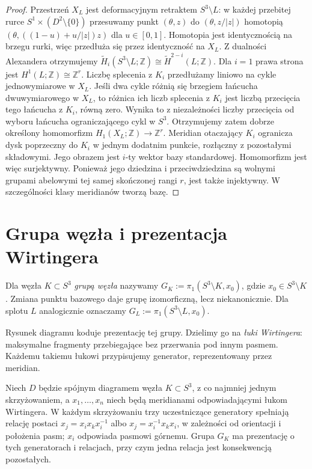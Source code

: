 \begin{proof}
Przestrzeń $X_L$ jest deformacyjnym retraktem
$S^3\setminus L$: w każdej przebitej rurce
$S^1\times(D^2\setminus\{0\})$ przesuwamy punkt
$(\theta,z)$ do $(\theta,z/|z|)$ homotopią
$(\theta,((1-u)+u/|z|)z)$ dla $u\in[0,1]$.
Homotopia jest identycznością na brzegu rurki,
więc przedłuża się przez identyczność na $X_L$.
Z dualności Alexandera otrzymujemy
$\widetilde H_i(S^3\setminus L;\mathbb Z)
\cong\widetilde H^{2-i}(L;\mathbb Z)$.
Dla $i=1$ prawa strona jest $H^1(L;\mathbb Z)\cong\mathbb Z^r$.
Liczbę splecenia z $K_i$ przedłużamy liniowo
na cykle jednowymiarowe w $X_L$. Jeśli dwa cykle
różnią się brzegiem łańcucha dwuwymiarowego w $X_L$,
to różnica ich liczb splecenia z $K_i$ jest liczbą
przecięcia tego łańcucha z $K_i$, równą zero.
Wynika to z niezależności liczby przecięcia od wyboru
łańcucha ograniczającego cykl w $S^3$.
Otrzymujemy zatem dobrze określony homomorfizm
$H_1(X_L;\mathbb Z)\to\mathbb Z^r$.
Meridian otaczający $K_i$ ogranicza dysk poprzeczny
do $K_i$ w jednym dodatnim punkcie, rozłączny
z pozostałymi składowymi. Jego obrazem jest $i$-ty
wektor bazy standardowej. Homomorfizm jest więc
surjektywny. Ponieważ jego dziedzina i przeciwdziedzina
są wolnymi grupami abelowymi tej samej skończonej
rangi $r$, jest także injektywny. W szczególności
klasy meridianów tworzą bazę.
\end{proof}

\section{Grupa węzła i prezentacja Wirtingera}
\label{sec:kt-wirtinger}

\begin{definicja}
Dla węzła $K\subset S^3$ \emph{grupą węzła} nazywamy
$G_K:=\pi_1(S^3\setminus K,x_0)$, gdzie $x_0\in S^3\setminus K$.
Zmiana punktu bazowego daje grupę izomorficzną, lecz niekanonicznie.
Dla splotu $L$ analogicznie oznaczamy $G_L:=\pi_1(S^3\setminus L,x_0)$.
\end{definicja}

Rysunek diagramu koduje prezentację tej grupy. Dzielimy go na
\emph{łuki Wirtingera}: maksymalne fragmenty przebiegające
bez przerwania pod innym pasmem. Każdemu takiemu łukowi
przypisujemy generator, reprezentowany przez meridian.

\begin{twierdzenie}
Niech $D$ będzie spójnym diagramem węzła $K\subset S^3$,
z co najmniej jednym skrzyżowaniem, a $x_1,\dots,x_n$ niech będą
meridianami odpowiadającymi łukom Wirtingera. W każdym skrzyżowaniu
trzy uczestniczące generatory spełniają relację postaci
$x_j=x_i x_k x_i^{-1}$ albo $x_j=x_i^{-1}x_kx_i$,
w zależności od orientacji i położenia pasm; $x_i$ odpowiada
pasmowi górnemu. Grupa $G_K$ ma prezentację o tych generatorach
i relacjach, przy czym jedna relacja jest konsekwencją pozostałych.
\end{twierdzenie}

